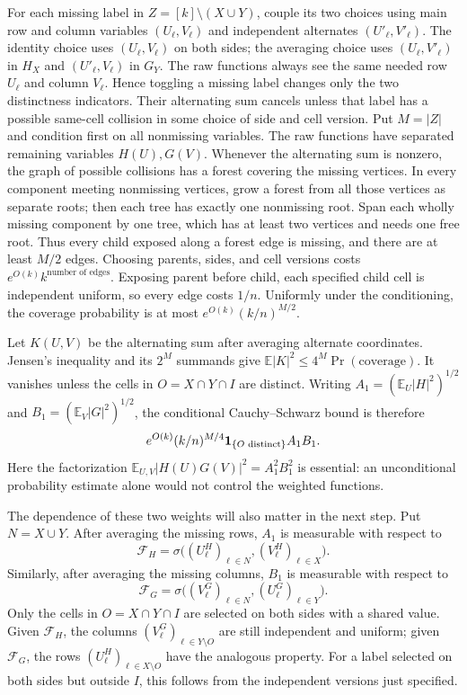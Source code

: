 For each missing label in $Z=[k]\setminus(X\cup Y)$, couple its
two choices using main row and column variables $(U_\ell,V_\ell)$
and independent alternates $(U'_\ell,V'_\ell)$.  The identity choice
uses $(U_\ell,V_\ell)$ on both sides; the averaging choice uses
$(U_\ell,V'_\ell)$ in $H_X$ and $(U'_\ell,V_\ell)$ in $G_Y$.
The raw functions always see the same needed row $U_\ell$ and column
$V_\ell$.  Hence toggling a missing label changes only the two
distinctness indicators.  Their alternating sum cancels unless that
label has a possible same-cell collision in some choice of side and
cell version.
Put $M=|Z|$ and condition first on all nonmissing variables.
The raw functions have separated remaining variables $H(U),G(V)$.
Whenever the alternating sum is nonzero, the graph of possible
collisions has a forest covering the missing vertices. In every
component meeting nonmissing vertices, grow a forest from all those
vertices as separate roots; then each tree has exactly one nonmissing
root. Span each wholly missing component by one tree, which has at
least two vertices and needs one free root. Thus every child exposed
along a forest edge is missing, and there are at least $M/2$ edges.
Choosing parents, sides, and cell versions costs
$e^{O(k)}k^{\text{number of edges}}$. Exposing parent before child,
each specified child cell is independent uniform, so every edge
costs $1/n$. Uniformly under the conditioning, the coverage probability
is at most $e^{O(k)}(k/n)^{M/2}$.

Let $K(U,V)$ be the alternating sum after averaging alternate
coordinates. Jensen's inequality and its $2^M$ summands give
$\mathbb E|K|^2\le4^M\Pr(\text{coverage})$.
It vanishes unless the cells in $O=X\cap Y\cap I$ are distinct.
Writing $A_1=(\mathbb E_U|H|^2)^{1/2}$ and
$B_1=(\mathbb E_V|G|^2)^{1/2}$, the conditional Cauchy--Schwarz
bound is therefore
\begin{equation}\label{s:conditional-collision-weight}
 e^{O(k)}(k/n)^{M/4}{\bf1}_{\{O\text{ distinct}\}}A_1B_1.
\end{equation}
Here the factorization
$\mathbb E_{U,V}|H(U)G(V)|^2=A_1^2B_1^2$ is essential:
an unconditional probability estimate alone would not control the
weighted functions.

The dependence of these two weights will also matter in the next step.
Put $N=X\cup Y$. After averaging the missing rows, $A_1$ is measurable
with respect to
\[
 \mathcal F_H=\sigma\big((U_\ell^H)_{\ell\in N},
                         (V_\ell^H)_{\ell\in X}\big).
\]
Similarly, after averaging the missing columns, $B_1$ is measurable
with respect to
\[
 \mathcal F_G=\sigma\big((V_\ell^G)_{\ell\in N},
                         (U_\ell^G)_{\ell\in Y}\big).
\]
Only the cells in $O=X\cap Y\cap I$ are selected on both sides
with a shared value. Given $\mathcal F_H$, the columns
$(V_\ell^G)_{\ell\in Y\setminus O}$ are still independent and
uniform; given $\mathcal F_G$, the rows
$(U_\ell^H)_{\ell\in X\setminus O}$ have the analogous property.
For a label selected on both sides but outside $I$, this follows from
the independent versions just specified.


